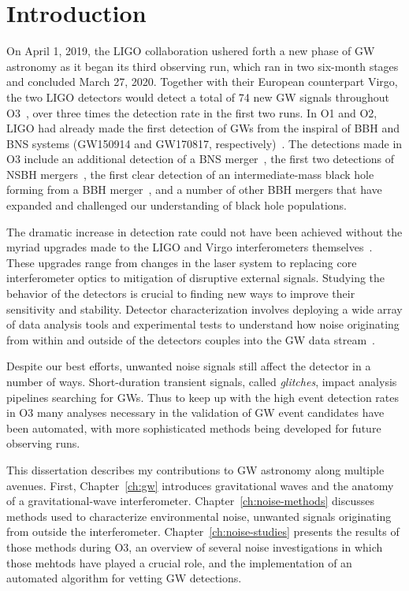 \chapter{Introduction}

On April 1, 2019, the \ac{LIGO} collaboration ushered forth a new phase of \ac{GW} astronomy as it began its third observing run, which ran in two six-month stages and concluded March 27, 2020.
Together with their European counterpart Virgo, the two \ac{LIGO} detectors would detect a total of 74 new \ac{GW} signals throughout \ac{O3}~\citep{gwtc2, gwtc3}, over three times the detection rate in the first two runs.
In \ac{O1} and \ac{O2}, \ac{LIGO} had already made the first detection of \acp{GW} from the inspiral of \ac{BBH} and \ac{BNS} systems (GW150914 and GW170817, respectively)~\citep{gw150914, gw170817}.
The detections made in \ac{O3} include an additional detection of a \ac{BNS} merger~\citep{gw190425}, the first two detections of \ac{NSBH} mergers~\citep{nsbh_o3}, the first clear detection of an intermediate-mass black hole forming from a \ac{BBH} merger~\citep{gw190521}, and a number of other \ac{BBH} mergers that have expanded and challenged our understanding of black hole populations.

The dramatic increase in detection rate could not have been achieved without the myriad upgrades made to the LIGO and Virgo interferometers themselves~\citep{Buikema_2020}.
These upgrades range from changes in the laser system to replacing core interferometer optics to mitigation of disruptive external signals.
Studying the behavior of the detectors is crucial to finding new ways to improve their sensitivity and stability.
Detector characterization involves deploying a wide array of data analysis tools and experimental tests to understand how noise originating from within and outside of the detectors couples into the \ac{GW} data stream~\citep{Davis_2019, Davis_2021}.

Despite our best efforts, unwanted noise signals still affect the detector in a number of ways.
Short-duration transient signals, called \textit{glitches}, impact analysis pipelines searching for \acp{GW}.
Thus to keep up with the high event detection rates in \ac{O3} many analyses necessary in the validation of \ac{GW} event candidates have been automated, with more sophisticated methods being developed for future observing runs.

This dissertation describes my contributions to \ac{GW} astronomy along multiple avenues. First, Chapter~\ref{ch:gw} introduces gravitational waves and the anatomy of a gravitational-wave interferometer. Chapter~\ref{ch:noise-methods} discusses methods used to characterize environmental noise, unwanted signals originating from outside the interferometer. Chapter~\ref{ch:noise-studies} presents the results of those methods during O3, an overview of several noise investigations in which those mehtods have played a crucial role, and the implementation of an automated algorithm for vetting \ac{GW} detections.

